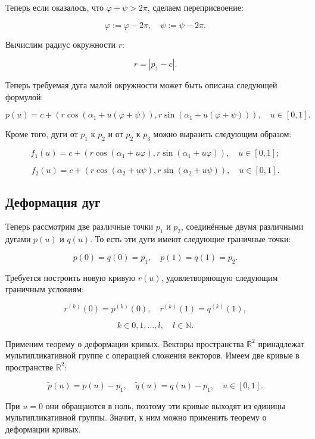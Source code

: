 Теперь если оказалось, что $\varphi+\psi>2\pi$, сделаем переприсвоение:

\begin{equation}
\varphi:=\varphi-2\pi, \quad \psi:=\psi-2\pi.
\label{angle-correction}
\end{equation}

Вычислим радиус окружности $r$:

$$
r=|p_1-c|.
$$

Теперь требуемая дуга малой окружности может быть описана следующей формулой:

$$
p(u)=c+(r\cos(\alpha_1+u(\varphi+\psi)),r\sin(\alpha_1+u(\varphi+\psi))), \quad u \in [0,1].
$$

Кроме того, дуги от $p_1$ к $p_2$ и от $p_2$ к $p_3$ можно выразить следующим образом:

\begin{equation}
f_1(u)=c+(r\cos(\alpha_1+u\varphi),r\sin(\alpha_1+u\varphi)), \quad u \in [0,1];
\label{arc-phi}
\end{equation}

\begin{equation}
f_2(u)=c+(r\cos(\alpha_2+u\psi),r\sin(\alpha_2+u\psi)), \quad u \in [0,1].
\label{arc-psi}
\end{equation}

\subsection*{Деформация дуг}

Теперь рассмотрим две различные точки $p_1$ и $p_2$, соединённые двумя различными дугами $p(u)$ и $q(u)$. То есть эти
дуги имеют следующие граничные точки:

$$
p(0)=q(0)=p_1, \quad p(1)=q(1)=p_2.
$$

Требуется построить новую кривую $r(u)$, удовлетворяющую следующим граничным условиям:

$$
r^{(k)}(0)=p^{(k)}(0), \quad r^{(k)}(1)=q^{(k)}(1),
$$

$$
k \in {0,1,\dots,l}, \quad l \in \mathbb{N}.
$$

Применим теорему о деформации кривых. Векторы пространства $\mathbb{R}^2$ принадлежат мультипликативной группе с
операцией сложения векторов. Имеем две кривые в пространстве $\mathbb{R}^2$:

$$
\tilde p(u)=p(u)-p_1, \quad \tilde q(u)=q(u)-p_1, \quad u \in [0,1].
$$

При $u=0$ они обращаются в ноль, поэтому эти кривые выходят из единицы мультипликативной группы. Значит, к ним можно
применить теорему о деформации кривых.

